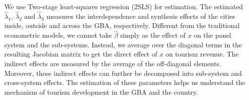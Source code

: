 \documentclass[11pt,a4paper]{amsart}
\theoremstyle{plain}
\theoremstyle{definition}
\begin{document}
We use Two-stage least-squares regression (2SLS) for estimation. The estimated $\widehat{\lambda}_{1}$,  $\widehat{\lambda}_{2}$ and  $\widehat{\lambda}_{3}$ measures the interdependence and synthesis effects of the cities inside, outside and across the GBA, respectively. Different from the traditional econometric models, we cannot take $\widehat{\beta}$ simply as the effect of $x$ on the panel system and the sub-systems. Instead, we average over the diagonal terms in the resulting Jacobian matrix to get the direct effect of $x$ on tourism revenue. The indirect effects are measured by the average of the off-diagonal elements. Moreover, these indirect effects can further be decomposed into sub-system and cross-system effects. The estimation of these parameters helps us understand the mechanism of tourism development in the GBA and the country.
\end{document}
